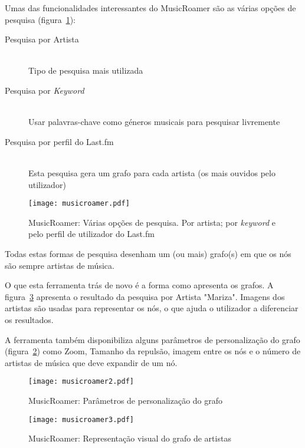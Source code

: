   
  Umas das funcionalidades interessantes do MusicRoamer são as várias opções de pesquisa (figura~\ref{fig:sota_musicroamer}):
  \begin{description}
    \item[Pesquisa por Artista] \hfill \\
      Tipo de pesquisa mais utilizada
    \item[Pesquisa por \emph{Keyword}] \hfill \\
      Usar palavras-chave como géneros musicais para pesquisar livremente
    \item[Pesquisa por perfil do Last.fm] \hfill \\
      Esta pesquisa gera um grafo para cada artista (os mais ouvidos pelo utilizador)
  \end{description}

  \begin{figure}[tb]
    \begin{center}
      \texttt{[image: musicroamer.pdf]}
    \end{center}
    \caption{MusicRoamer: Várias opções de pesquisa. Por artista; por \emph{keyword} e pelo perfil de utilizador do Last.fm}
    \label{fig:sota_musicroamer}
  \end{figure}

  Todas estas formas de pesquisa desenham um (ou mais) grafo(s) em que os nós são sempre artistas de música.

  O que esta ferramenta trás de novo é a forma como apresenta os grafos.
  A figura~\ref{fig:sota_musicroamer3} apresenta o resultado da pesquisa por Artista "Mariza".
  Imagens dos artistas são usadas para representar os nós, o que ajuda o utilizador a diferenciar os resultados.

  A ferramenta também disponibiliza alguns parâmetros de personalização do grafo (figura~\ref{fig:sota_musicroamer2}) como Zoom, Tamanho da repulsão, imagem entre os nós e o número de artistas de música que deve expandir de um nó.

  \begin{figure}[tb]
    \begin{center}
      \texttt{[image: musicroamer2.pdf]}
    \end{center}
    \caption{MusicRoamer: Parâmetros de personalização do grafo}
    \label{fig:sota_musicroamer2}
  \end{figure}



  \begin{figure}[tb]
    \begin{center}
      \texttt{[image: musicroamer3.pdf]}
    \end{center}
    \caption{MusicRoamer: Representação visual do grafo de artistas}
    \label{fig:sota_musicroamer3}
  \end{figure}

